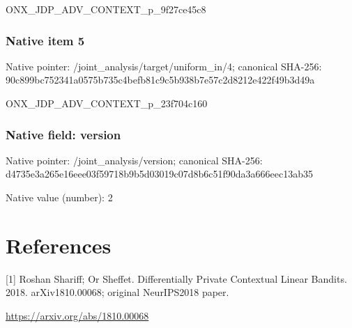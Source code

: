 \documentclass[10pt,a4paper]{article}
\begin{document}
\begingroup\raggedright\sloppy ONX\_\allowbreak{}JDP\_\allowbreak{}ADV\_\allowbreak{}CONTEXT\_\allowbreak{}p\_\allowbreak{}9f27ce45c8\par\endgroup

\subsubsection{Native item 5}
Native pointer: /joint\_\allowbreak{}analysis/target/uniform\_\allowbreak{}in/4; canonical SHA-256: 90c899bc752341a0575b735c4befb81c9c5b938b7e57c2d8212e422f49b3d49a

\begingroup\raggedright\sloppy ONX\_\allowbreak{}JDP\_\allowbreak{}ADV\_\allowbreak{}CONTEXT\_\allowbreak{}p\_\allowbreak{}23f704c160\par\endgroup

\subsubsection{Native field: version}
Native pointer: /joint\_\allowbreak{}analysis/version; canonical SHA-256: d4735e3a265e16eee03f59718b9b5d03019c07d8b6c51f90da3a666eec13ab35

Native value (number): 2

\section{References}
[1] Roshan Shariff; Or Sheffet. Differentially Private Contextual Linear Bandits. 2018. arXiv1810.00068; original NeurIPS2018 paper.

\url{https://arxiv.org/abs/1810.00068}
\end{document}
